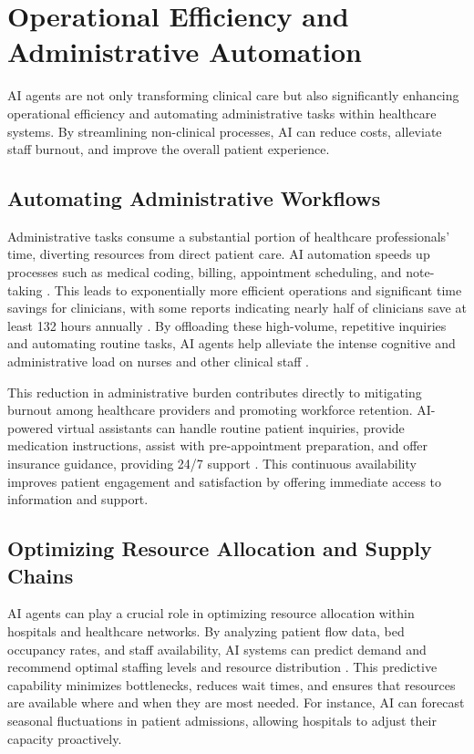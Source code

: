 \documentclass[12pt,a4paper]{article}
\begin{document}
\section{Operational Efficiency and Administrative Automation}
\label{sec:operational_efficiency}
AI agents are not only transforming clinical care but also significantly enhancing operational efficiency and automating administrative tasks within healthcare systems. By streamlining non-clinical processes, AI can reduce costs, alleviate staff burnout, and improve the overall patient experience.

\subsection{Automating Administrative Workflows}
\label{sec:admin_automation}
Administrative tasks consume a substantial portion of healthcare professionals' time, diverting resources from direct patient care. AI automation speeds up processes such as medical coding, billing, appointment scheduling, and note-taking \cite{who2021ai}. This leads to exponentially more efficient operations and significant time savings for clinicians, with some reports indicating nearly half of clinicians save at least 132 hours annually \cite{who2021ai}. By offloading these high-volume, repetitive inquiries and automating routine tasks, AI agents help alleviate the intense cognitive and administrative load on nurses and other clinical staff \cite{ey_global_regulatory}.

This reduction in administrative burden contributes directly to mitigating burnout among healthcare providers and promoting workforce retention. AI-powered virtual assistants can handle routine patient inquiries, provide medication instructions, assist with pre-appointment preparation, and offer insurance guidance, providing 24/7 support \cite{ibm_watson_health}. This continuous availability improves patient engagement and satisfaction by offering immediate access to information and support.

\subsection{Optimizing Resource Allocation and Supply Chains}
\label{sec:resource_optimization}
AI agents can play a crucial role in optimizing resource allocation within hospitals and healthcare networks. By analyzing patient flow data, bed occupancy rates, and staff availability, AI systems can predict demand and recommend optimal staffing levels and resource distribution \cite{dataart_digital_transformation}. This predictive capability minimizes bottlenecks, reduces wait times, and ensures that resources are available where and when they are most needed. For instance, AI can forecast seasonal fluctuations in patient admissions, allowing hospitals to adjust their capacity proactively.
\end{document}
